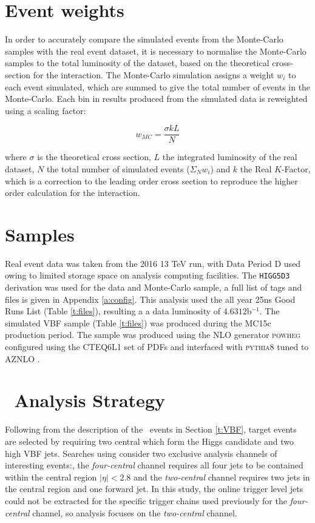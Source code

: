 	\section{Event weights}

		 In order to accurately compare the simulated events from the Monte-Carlo samples with the real event dataset, it is necessary to normalise the Monte-Carlo samples to the total luminosity of the dataset, based on the theoretical cross-section for the interaction. The Monte-Carlo simulation assigns a weight $w_i$ to each event simulated, which are summed to give the total number of events in the Monte-Carlo. Each bin in results produced from the simulated data is reweighted using a scaling factor:

		 \begin{equation}
		 w_{MC} = \frac{\sigma k L}{N}
		 \end{equation}

		 where $\sigma$ is the theoretical cross section, $L$ the integrated luminosity of the real dataset, $N$ the total number of simulated events ($\Sigma_N w_i$) and $k$ the Real $K$-Factor, which is a correction to the leading order cross section to reproduce the higher order calculation for the interaction.


	\section{Samples}
		 Real event data was taken from the 2016 13 TeV run, with Data Period D used owing to limited storage space on analysis computing facilities. The \texttt{HIGG5D3} derivation was used for the data and Monte-Carlo sample, a full list of tags and files is given in Appendix \ref{a:config}. This analysis used the all year 25ns Good Runs List (Table \ref{t:files}), resulting a a data luminosity of $4.6312$b$^{-1}$. The simulated VBF sample (Table \ref{t:files}) was produced during the MC15c production period. The sample was produced using the NLO generator \textsc{powheg} configured using the CTEQ6L1 \cite{CTEQ} set of PDFs and interfaced with \textsc{pythia8} tuned to AZNLO \cite{AZNLO}.

	\section{\VBFHBB\, Analysis Strategy}
		 Following from the description of the \VBFHBB\, events in Section \ref{t:VBF}, target events are selected by requiring two central \bjets which form the Higgs candidate and two high \pt VBF jets. Searches using \VBFHBB consider two exclusive analysis channels of interesting events:, the \textit{four-central} channel requires all four jets to be contained within the central region $|\eta| < 2.8$ and the \textit{two-central} channel requires two jets in the central region and one forward jet. In this study, the online trigger level jets could not be extracted for the specific trigger chains used previously for the \textit{four-central} channel, so analysis focuses on the \textit{two-central} channel.

